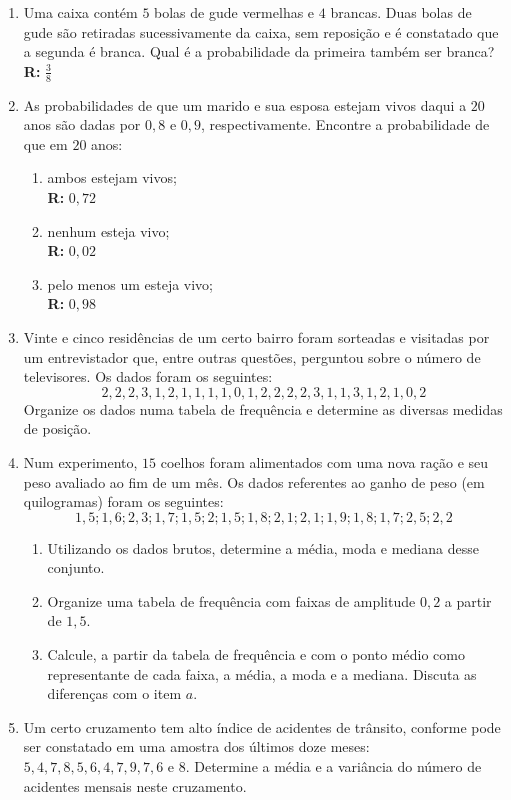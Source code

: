 \documentclass[oneside,a4paper,12pt]{article}
\begin{document}
\begin{enumerate}
	\item Uma caixa contém $5$ bolas de gude vermelhas e $4$ brancas. Duas bolas de gude são retiradas sucessivamente da caixa, sem reposição e é constatado que a segunda é branca. Qual é a probabilidade da primeira também ser branca? \\ {\bf R: } $\frac{3}{8}$

	\item As probabilidades de que um marido e sua esposa estejam vivos daqui a $20$ anos são dadas por $0,8$ e $0,9$, respectivamente. Encontre a probabilidade de que em $20$ anos:
	\begin{enumerate}
		\item ambos estejam vivos; \\ {\bf R: } $0,72$
		\item nenhum esteja vivo; \\ {\bf R: } $0,02$
		\item pelo menos um esteja vivo; \\ {\bf R: } $0,98$
	\end{enumerate}

	\item Vinte e cinco residências de um certo bairro foram sorteadas e visitadas por um entrevistador que, entre outras questões, perguntou sobre o número de televisores. Os dados foram os seguintes:
	$$2,2,2,3,1,2,1,1,1,1,0,1,2,2,2,2,3,1,1,3,1,2,1,0,2$$
	Organize os dados numa tabela de frequência e determine as diversas medidas de posição.
	
	\item Num experimento, $15$ coelhos foram alimentados com uma nova ração e seu peso avaliado ao fim de um mês. Os dados referentes ao ganho de peso (em quilogramas) foram os seguintes:
	$$1,5;1,6;2,3;1,7;1,5;2;1,5;1,8;2,1;2,1;1,9;1,8;1,7;2,5;2,2$$
	\begin{enumerate}
		\item Utilizando os dados brutos, determine a média, moda e mediana desse conjunto.
		\item Organize uma tabela de frequência com faixas de amplitude $0,2$ a partir de $1,5$.
		\item Calcule, a partir da tabela de frequência e com o ponto médio como representante de cada faixa, a média, a moda e a mediana. Discuta as diferenças com o item $a$.
	\end{enumerate}

	\item Um certo cruzamento tem alto índice de acidentes de trânsito, conforme pode ser constatado em uma amostra dos últimos doze meses: $5,4,7,8,5,6,4,7,9,7,6$ e $8$. Determine a média e a variância do número de acidentes mensais neste cruzamento.
	

\end{enumerate}
\end{document}
